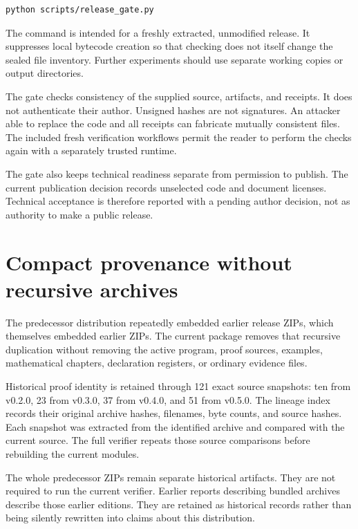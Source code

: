 \documentclass[11pt,letterpaper,oneside,openany]{book}
\theoremstyle{quiet}
\begin{document}
\begin{Verbatim}[fontsize=\small,breaklines=true]
python scripts/release_gate.py
\end{Verbatim}

The command is intended for a freshly extracted, unmodified release. It suppresses local bytecode creation so that checking does not itself change the sealed file inventory. Further experiments should use separate working copies or output directories.

\begin{scopebox}[title=What a passing gate means]
The gate checks consistency of the supplied source, artifacts, and receipts. It does not authenticate their author. Unsigned hashes are not signatures. An attacker able to replace the code and all receipts can fabricate mutually consistent files. The included fresh verification workflows permit the reader to perform the checks again with a separately trusted runtime.
\end{scopebox}

The gate also keeps technical readiness separate from permission to publish. The current publication decision records unselected code and document licenses. Technical acceptance is therefore reported with a pending author decision, not as authority to make a public release.

\section{Compact provenance without recursive archives}

The predecessor distribution repeatedly embedded earlier release ZIPs, which themselves embedded earlier ZIPs. The current package removes that recursive duplication without removing the active program, proof sources, examples, mathematical chapters, declaration registers, or ordinary evidence files.

Historical proof identity is retained through 121 exact source snapshots: ten from v0.2.0, 23 from v0.3.0, 37 from v0.4.0, and 51 from v0.5.0. The lineage index records their original archive hashes, filenames, byte counts, and source hashes. Each snapshot was extracted from the identified archive and compared with the current source. The full verifier repeats those source comparisons before rebuilding the current modules.

The whole predecessor ZIPs remain separate historical artifacts. They are not required to run the current verifier. Earlier reports describing bundled archives describe those earlier editions. They are retained as historical records rather than being silently rewritten into claims about this distribution.
\end{document}
